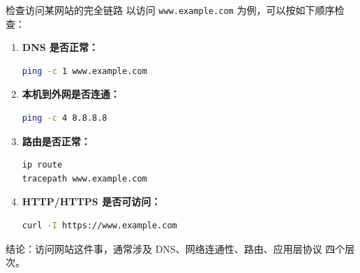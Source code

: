 \documentclass[aspectratio=169]{beamer}
\begin{document}
\begin{frame}[fragile]{检查访问某网站的完全链路}
以访问 \texttt{www.example.com} 为例，可以按如下顺序检查：

\begin{enumerate}
  \item \textbf{DNS 是否正常：}
\begin{lstlisting}[language=bash]
ping -c 1 www.example.com
\end{lstlisting}

  \item \textbf{本机到外网是否连通：}
\begin{lstlisting}[language=bash]
ping -c 4 8.8.8.8
\end{lstlisting}

  \item \textbf{路由是否正常：}
\begin{lstlisting}[language=bash]
ip route
tracepath www.example.com
\end{lstlisting}

  \item \textbf{HTTP/HTTPS 是否可访问：}
\begin{lstlisting}[language=bash]
curl -I https://www.example.com
\end{lstlisting}
\end{enumerate}

\vspace{0.3em}
结论：访问网站这件事，通常涉及 \alert{DNS、网络连通性、路由、应用层协议} 四个层次。
\end{frame}
\end{document}
